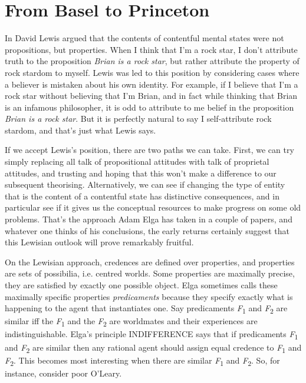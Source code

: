 \section{From Basel to Princeton}

In \citeyearpar{Lewis1979b} David Lewis argued that the contents of contentful mental states were not propositions, but properties. When I think that I'm a rock star, I don't attribute truth to the proposition \textit{Brian is a rock star}, but rather attribute the property of rock stardom to myself. Lewis was led to this position by considering cases where a believer is mistaken about his own identity. For example, if I believe that I'm a rock star without believing that I'm Brian, and in fact while thinking that Brian is an infamous philosopher, it is odd to attribute to me belief in the proposition \textit{Brian is a rock star}. But it is perfectly natural to say I self-attribute rock stardom, and that's just what Lewis says.

If we accept Lewis's position, there are two paths we can take. First, we can try simply replacing all talk of propositional attitudes with talk of proprietal attitudes, and trusting and hoping that this won't make a difference to our subsequent theorising. Alternatively, we can see if changing the type of entity that is the content of a contentful state has distinctive consequences, and in particular see if it gives us the conceptual resources to make progress on some old problems. That's the approach Adam Elga has taken in a couple of papers, and whatever one thinks of his conclusions, the early returns certainly suggest that this Lewisian outlook will prove remarkably fruitful.

On the Lewisian approach, credences are defined over properties, and properties are sets of possibilia, i.e. centred worlds. Some properties are maximally precise, they are satisfied by exactly one possible object. Elga sometimes calls these maximally specific properties \textit{predicaments} because they specify exactly what is happening to the agent that instantiates one. Say predicaments \textit{F}\textsubscript{1} and \textit{F}\textsubscript{2} are similar iff the \textit{F}\textsubscript{1} and the \textit{F}\textsubscript{2} are worldmates and their experiences are indistinguishable. Elga's principle INDIFFERENCE says that if predicaments \textit{F}\textsubscript{1} and \textit{F}\textsubscript{2} are similar then any rational agent should assign equal credence to \textit{F}\textsubscript{1} and \textit{F}\textsubscript{2}. This becomes most interesting when there are similar \textit{F}\textsubscript{1} and \textit{F}\textsubscript{2}. So, for instance, consider poor O'Leary.

